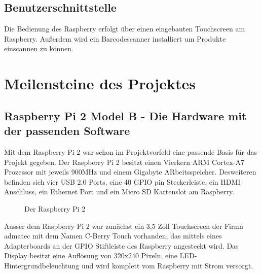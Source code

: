 \documentclass[11pt,a4paper]{article} %
\begin{document}
\subsection{Benutzerschnittstelle}
Die Bedienung des Raspberry erfolgt über einen eingebauten Touchscreen am Raspberry. Außerdem wird ein Barcodescanner installiert um Produkte einscannen zu können.

\newpage


\section{Meilensteine des Projektes}
\label{Meilensteine}

\subsection{Raspberry Pi 2 Model B - Die Hardware mit der passenden Software}
Mit dem Raspberry Pi 2 war schon im Projektvorfeld eine passende Basis für das Projekt gegeben. Der Raspberry Pi 2 besitzt einen Vierkern ARM Cortex-A7 Prozessor mit jeweils 900MHz und einem Gigabyte ARbeitsspeicher. Desweiteren befinden sich vier USB 2.0 Ports, eine 40 GPIO pin Steckerleiste, ein HDMI Anschluss, ein Ethernet Port und ein Micro SD Kartenslot am Raspberry.
	\begin{figure}[h]
	\caption{Der Raspberry Pi 2}
	\end{figure}
\par
Ausser dem Raspberry Pi 2 war zunächst ein 3,5 Zoll Touchscreen der Firma admatec \cite{1} mit dem Namen C-Berry Touch vorhanden, das mittels eines Adapterboards an der GPIO Stiftleiste des Raspberry angesteckt wird. Das Display besitzt eine Auflösung von 320x240 Pixeln, eine LED- Hintergrundbeleuchtung und wird komplett vom Raspberry mit Strom versorgt.
\par
\end{document}
